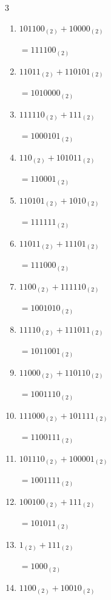 \begin{multicols}{3}
\begin{enumerate}
        $=1000101_{(2)}$

  \item $101100_{(2)} + 10000_{(2)}$

        $=111100_{(2)}$

  \item $11011_{(2)} + 110101_{(2)}$

        $=1010000_{(2)}$

  \item $111110_{(2)} + 111_{(2)}$

        $=1000101_{(2)}$

  \item $110_{(2)} + 101011_{(2)}$

        $=110001_{(2)}$

  \item $110101_{(2)} + 1010_{(2)}$

        $=111111_{(2)}$

  \item $11011_{(2)} + 11101_{(2)}$

        $=111000_{(2)}$

  \item $1100_{(2)} + 111110_{(2)}$

        $=1001010_{(2)}$

  \item $11110_{(2)} + 111011_{(2)}$

        $=1011001_{(2)}$

\columnbreak %

\resetques

  \item $11000_{(2)} + 110110_{(2)}$

        $=1001110_{(2)}$

  \item $111000_{(2)} + 101111_{(2)}$

        $=1100111_{(2)}$

  \item $101110_{(2)} + 100001_{(2)}$

        $=1001111_{(2)}$

  \item $100100_{(2)} + 111_{(2)}$

        $=101011_{(2)}$

  \item $1_{(2)} + 111_{(2)}$

        $=1000_{(2)}$

  \item $1100_{(2)} + 10010_{(2)}$


\end{enumerate}
\end{multicols}
